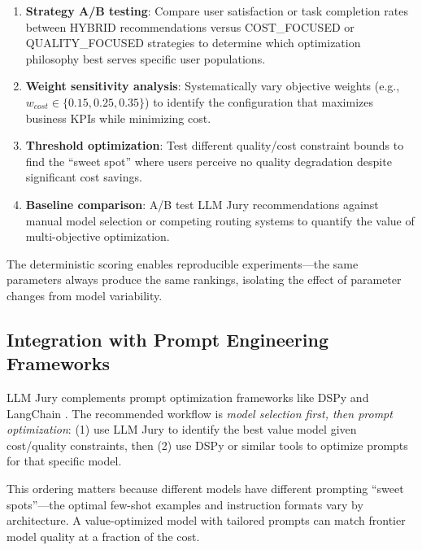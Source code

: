 \documentclass[11pt,a4paper]{article}
\begin{document}
\begin{enumerate}
    \item \textbf{Strategy A/B testing}: Compare user satisfaction or task completion rates between HYBRID recommendations versus COST\_FOCUSED or QUALITY\_FOCUSED strategies to determine which optimization philosophy best serves specific user populations.
    
    \item \textbf{Weight sensitivity analysis}: Systematically vary objective weights (e.g., $w_{cost} \in \{0.15, 0.25, 0.35\}$) to identify the configuration that maximizes business KPIs while minimizing cost.
    
    \item \textbf{Threshold optimization}: Test different quality/cost constraint bounds to find the ``sweet spot'' where users perceive no quality degradation despite significant cost savings.
    
    \item \textbf{Baseline comparison}: A/B test LLM Jury recommendations against manual model selection or competing routing systems to quantify the value of multi-objective optimization.
\end{enumerate}

The deterministic scoring enables reproducible experiments---the same parameters always produce the same rankings, isolating the effect of parameter changes from model variability.

\subsection{Integration with Prompt Engineering Frameworks}

LLM Jury complements prompt optimization frameworks like DSPy \cite{khattab2023dspy} and LangChain \cite{langchain2023}. The recommended workflow is \textit{model selection first, then prompt optimization}: (1) use LLM Jury to identify the best value model given cost/quality constraints, then (2) use DSPy or similar tools to optimize prompts for that specific model.

This ordering matters because different models have different prompting ``sweet spots''---the optimal few-shot examples and instruction formats vary by architecture. A value-optimized model with tailored prompts can match frontier model quality at a fraction of the cost.

\end{document}
